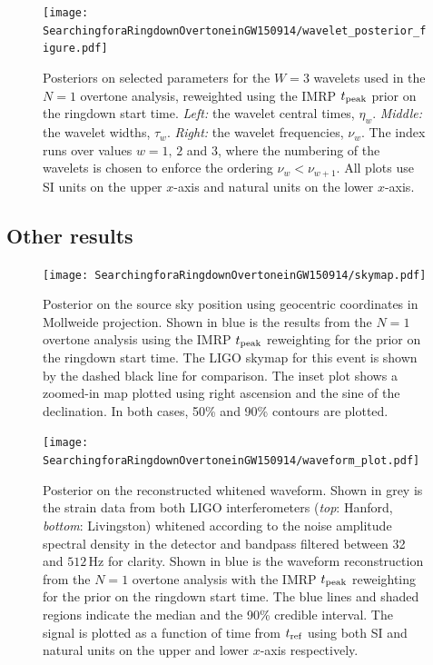 \begin{figure}[t]
    \centering
    \texttt{[image: SearchingforaRingdownOvertoneinGW150914/wavelet\_posterior\_figure.pdf]}
    \caption[Posteriors on selected wavelet parameters from the GW150914 overtone analysis for the preferred choice of ringdown start-time prior]{ 
    Posteriors on selected parameters for the $W=3$ wavelets used in the $N=1$ overtone analysis, reweighted using the IMRP $t_{\rm peak}$ prior on the ringdown start time.
    \emph{Left:} the wavelet central times, $\eta_w$.
    \emph{Middle:} the wavelet widths, $\tau_w$.
    \emph{Right:} the wavelet frequencies, $\nu_w$. 
    The index runs over values $w=1,\,2$ and $3$, where the numbering of the wavelets is chosen to enforce the ordering $\nu_{w}<\nu_{w+1}$.
    All plots use SI units on the upper $x$-axis and natural units on the lower $x$-axis. 
    }
    \label{fig:wavelet}
\end{figure}



\subsection{Other results}\label{subsec:other_results}

\begin{figure}[b!]
    \centering
    \texttt{[image: SearchingforaRingdownOvertoneinGW150914/skymap.pdf]}
    \caption[Posterior on the sky location from the GW150914 overtone analysis for the preferred choice of ringdown start-time prior]{ 
    Posterior on the source sky position using geocentric coordinates in Mollweide projection.
    Shown in blue is the results from the $N=1$ overtone analysis using the IMRP $t_{\rm peak}$ reweighting for the prior on the ringdown start time.
    The LIGO skymap for this event is shown by the dashed black line for comparison.
    The inset plot shows a zoomed-in map plotted using right ascension and the sine of the declination.
    In both cases, 50\% and 90\% contours are plotted.
    }
    \label{fig:skymap}
\end{figure}

\begin{figure}[t]
    \centering
    \texttt{[image: SearchingforaRingdownOvertoneinGW150914/waveform\_plot.pdf]}
    \caption[Whitened waveform reconstructions from the GW150914 overtone analysis for the preferred choice of ringdown start-time prior]{ 
    Posterior on the reconstructed whitened waveform.
    Shown in grey is the strain data from both LIGO interferometers (\emph{top}: Hanford, \emph{bottom}: Livingston) whitened according to the noise amplitude spectral density in the detector and bandpass filtered between 32 and $512\,\mathrm{Hz}$ for clarity.
    Shown in blue is the waveform reconstruction from the $N=1$ overtone analysis with the IMRP $t_{\rm peak}$ reweighting for the prior on the ringdown start time.
    The blue lines and shaded regions indicate the median and the 90\% credible interval. 
    The signal is plotted as a function of time from $t_{\rm ref}$ using both SI and natural units on the upper and lower $x$-axis respectively.
    }
    \label{fig:waveform}
\end{figure}

